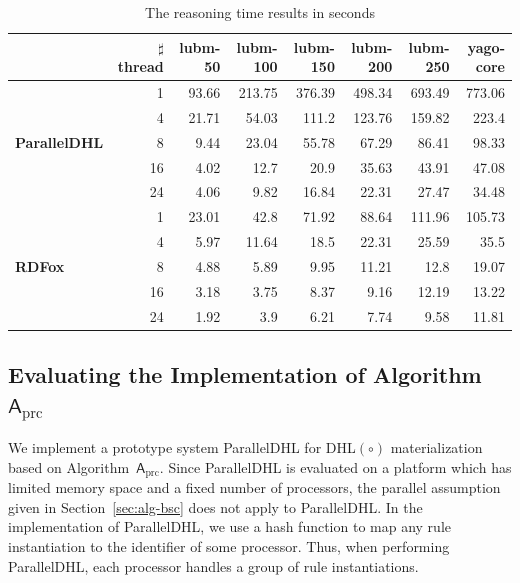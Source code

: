 \begin{table}
\centering
\caption{The reasoning time results in seconds}
{\setlength{\tabcolsep}{1.5mm}
\begin{tabular}{|l|r|r|r|r|r|r|r|}
\hline
&\small$\sharp$thread&lubm-50&lubm-100&lubm-150&lubm-200&lubm-250&yago-core\\
\hline
\multirow{5}{*}{ \small{\textbf{ParallelDHL}}}&1&93.66&213.75&376.39&498.34&693.49&773.06\\
                    &4&21.71&54.03&111.2&123.76&159.82&223.4\\
                    &8&9.44&23.04&55.78&67.29&86.41&98.33\\
                    &16&4.02&12.7&20.9&35.63&43.91&47.08\\
                    &24&4.06&9.82&16.84&22.31&27.47&34.48\\
\hline
\multirow{5}{*}{ \small{\textbf{RDFox}}}&1&23.01&42.8&71.92&88.64&111.96&105.73\\
                    &4&5.97&11.64&18.5&22.31&25.59&35.5\\
                    &8&4.88&5.89&9.95&11.21&12.8&19.07\\
                    &16&3.18&3.75&8.37&9.16&12.19&13.22\\
                    &24&1.92&3.9&6.21&7.74&9.58&11.81\\
\hline
\end{tabular}}
\label{tab:result}
\end{table}


\subsection{Evaluating the Implementation of Algorithm~$\mathsf{A}_{\text{prc}}$}

We implement a prototype system ParallelDHL for DHL$(\circ)$ materialization
based on Algorithm~$\mathsf{A}_{\text{prc}}$. Since ParallelDHL is
evaluated on a
platform which has limited memory space and a fixed number of processors,
the parallel assumption given in Section~\ref{sec:alg-bsc} does not apply to ParallelDHL.
In the implementation of ParallelDHL, we use a hash function to map any rule instantiation
to the identifier of some processor. Thus, when performing ParallelDHL,
each processor handles a group of rule instantiations.

